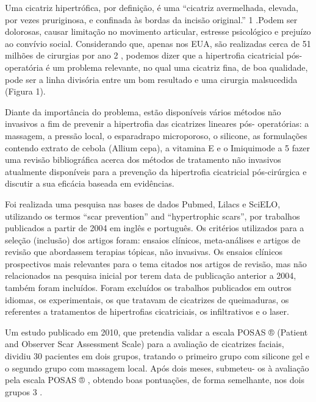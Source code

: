 \begin{multicols}{2}

\par{}Uma cicatriz hipertrófica, por definição, é uma
“cicatriz avermelhada, elevada, por vezes pruriginosa,
e confinada às bordas da incisão original.” 1 .Podem ser
dolorosas, causar limitação no movimento articular,
estresse psicológico e prejuízo ao convívio social.
Considerando que, apenas nos EUA, são realizadas
cerca de 51 milhões de cirurgias por ano 2 , podemos
dizer que a hipertrofia cicatricial pós-operatória é um
problema relevante, no qual uma cicatriz fina, de boa
qualidade, pode ser a linha divisória entre um bom
resultado e uma cirurgia malsucedida (Figura 1).
\par{}Diante da importância do problema, estão
disponíveis vários métodos não invasivos a fim de
prevenir a hipertrofia das cicatrizes lineares pós-
operatórias: a massagem, a pressão local, o esparadrapo
microporoso, o silicone, as formulações contendo
extrato de cebola (Allium cepa), a vitamina E e o
Imiquimode a 5%
fazer uma revisão bibliográfica acerca dos métodos de
tratamento não invasivos atualmente disponíveis para
a prevenção da hipertrofia cicatricial pós-cirúrgica e
discutir a sua eficácia baseada em evidências.


\par{}Foi realizada uma pesquisa nas bases de dados
Pubmed, Lilacs e SciELO, utilizando os termos “scar
prevention” and “hypertrophic scars”, por trabalhos
publicados a partir de 2004 em inglês e português. Os critérios utilizados para a seleção (inclusão)
dos artigos foram: ensaios clínicos, meta-análises e
artigos de revisão que abordassem terapias tópicas,
não invasivas. Os ensaios clínicos prospectivos mais
relevantes para o tema citados nos artigos de revisão,
mas não relacionados na pesquisa inicial por terem
data de publicação anterior a 2004, também foram
incluídos. Foram excluídos os trabalhos publicados em
outros idiomas, os experimentais, os que tratavam de
cicatrizes de queimaduras, os referentes a tratamentos
de hipertrofias cicatriciais, os infiltrativos e o laser.

\lipsum


\par{}Um estudo publicado em 2010, que pretendia
validar a escala POSAS ® (Patient and Observer Scar
Assessment Scale) para a avaliação de cicatrizes
faciais, dividiu 30 pacientes em dois grupos, tratando
o primeiro grupo com silicone gel e o segundo grupo
com massagem local. Após dois meses, submeteu-
os à avaliação pela escala POSAS ® , obtendo boas
pontuações, de forma semelhante, nos dois grupos 3 .


\end{multicols}
